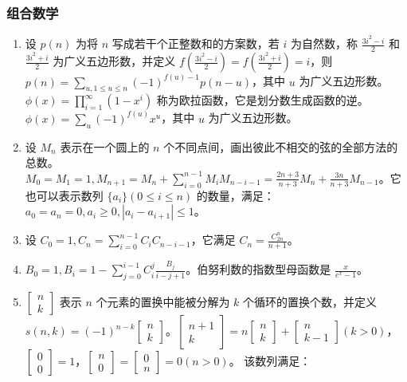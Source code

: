 \subsubsection{组合数学}

\begin{enumerate}

\item 设 $p(n)$ 为将 $n$ 写成若干个正整数和的方案数，若 $i$ 为自然数，称 $\frac{3i^{2}-i}{2}$ 和 $\frac{3i^{2}+i}{2}$ 为广义五边形数，并定义 $f(\frac{3i^{2}-i}{2}) = f(\frac{3i^{2}+i}{2}) = i$，则 $p(n) = \sum_{u,1 \le u \le n}(-1)^{f(u) - 1}p(n-u)$，其中 $u$ 为广义五边形数。$\displaystyle{\phi(x)=\prod_{i=1}^{\infty}(1-x^{i})}$ 称为欧拉函数，它是划分数生成函数的逆。$\phi(x) = \sum_{u}(-1)^{f(u)}x^{u}$，其中 $u$ 为广义五边形数。

\item 设 $M_{n}$ 表示在一个圆上的 $n$ 个不同点间，画出彼此不相交的弦的全部方法的总数。$M_{0} = M_{1} = 1, M_{n + 1} = M_{n}+\sum_{i=0}^{n-1}M_{i}M_{n-i-1} = \frac{2n+3}{n+3}M_{n}+\frac{3n}{n+3}M_{n-1}$。它也可以表示数列 $\{a_{i}\}(0 \le i \le n)$ 的数量，满足：$a_{0} = a_{n} = 0, a_{i} \ge 0, |a_{i}-a_{i + 1}| \le 1$。

\item 设 $C_{0}=1,C_{n}=\sum_{i=0}^{n-1}C_{i}C_{n-i-1}$，它满足 $\displaystyle{C_{n} = \frac{C_{2n}^{n}}{n+1}}$。

\item $B_{0} = 1, B_{i}=1-\sum_{j = 0}^{i-1}C_{i}^{j}\frac{B_{j}}{i-j+1}$。伯努利数的指数型母函数是 $\frac{x}{e^{x}-1}$。

\item $\begin{bmatrix}n\\k\end{bmatrix}$ 表示 $n$ 个元素的置换中能被分解为 $k$ 个循环的置换个数，并定义 $s(n,k)=(-1)^{n-k}\begin{bmatrix}n\\k\end{bmatrix}$。$\begin{bmatrix}n+1\\k\end{bmatrix}=n\begin{bmatrix}n\\k\end{bmatrix}+\begin{bmatrix}n\\k-1\end{bmatrix}(k>0)$，$\begin{bmatrix}0\\0\end{bmatrix}=1$，$\begin{bmatrix}n\\0\end{bmatrix}=\begin{bmatrix}0\\n\end{bmatrix}=0(n>0)$。
该数列满足：


\end{enumerate}

